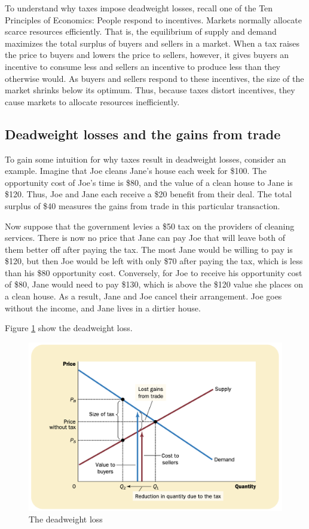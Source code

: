 To understand why taxes impose deadweight losses, recall one of the Ten Principles of Economics: People respond to incentives.
Markets normally allocate scarce resources efficiently.
That is, the equilibrium of supply and demand maximizes the total surplus of buyers and sellers in a market.
When a tax raises the price to buyers and lowers the price to sellers, however, it gives buyers an incentive to consume less and sellers an incentive to produce less than they otherwise would.
As buyers and sellers respond to these incentives, the size of the market shrinks below its optimum.
Thus, because taxes distort incentives, they cause markets to allocate resources inefficiently.



\subsection{Deadweight losses and the gains from trade}


To gain some intuition for why taxes result in deadweight losses, consider an example.
Imagine that Joe cleans Jane’s house each week for \$100.
The opportunity cost of Joe’s time is \$80, and the value of a clean house to Jane is \$120.
Thus, Joe and Jane each receive a \$20 benefit from their deal.
The total surplus of \$40 measures the gains from trade in this particular transaction.

Now suppose that the government levies a \$50 tax on the providers of cleaning services.
There is now no price that Jane can pay Joe that will leave both of them better off after paying the tax.
The most Jane would be willing to pay is \$120, but then Joe would be left with only \$70 after paying the tax, which is less than his \$80 opportunity cost.
Conversely, for Joe to receive his opportunity cost of \$80, Jane would need to pay \$130, which is above the \$120 value she places on a clean house.
As a result, Jane and Joe cancel their arrangement. Joe goes without the income, and Jane lives in a dirtier house.


Figure \ref{fig:the-deadweight-loss} show the deadweight loss.

\begin{figure}[!ht]
  \centering
  \includegraphics[width=\textwidth]{pics/the-deadweight-loss}
  \caption{The deadweight loss}
  \label{fig:the-deadweight-loss}
\end{figure}


